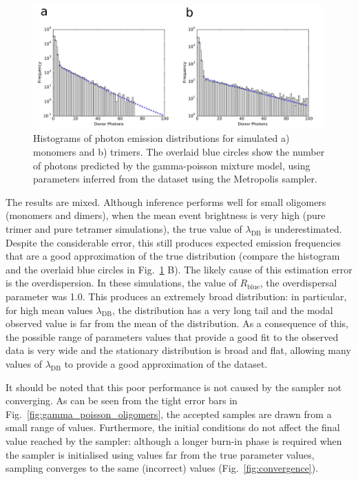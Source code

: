 \begin{figure}
   \begin{center}
      \includegraphics*[clip=true, width=6in]{sizing/oligomer_marginals.pdf}
      \caption{Histograms of photon emission distributions for simulated a) monomers and b) trimers. The overlaid blue circles show the  number of photons predicted by the gamma-poisson mixture model, using parameters inferred from the dataset using the Metropolis sampler.}
      \label{fig:hist_fit_trimer}
   \end{center}
\end{figure}

The results are mixed. Although inference performs well for small oligomers (monomers and dimers), when the mean event brightness is very high (pure trimer and pure tetramer simulations), the true value of $\lambda_{\text{DB}}$ is underestimated. Despite the considerable error, this still produces expected emission frequencies that are a good approximation of the true distribution (compare the histogram and the overlaid blue circles in Fig.~\ref{fig:hist_fit_trimer} B). The likely cause of this estimation error is the overdispersion. In these simulations, the value of $R_{\text{blue}}$, the overdispersal parameter was 1.0. This produces an extremely broad distribution: in particular, for high mean values $\lambda_{\text{DB}}$, the distribution has a very long tail and the modal observed value is far from the mean of the distribution. As a consequence of this, the possible range of parameters values that provide a good fit to the observed data is very wide and the stationary distribution is broad and flat, allowing many values of $\lambda_{\text{DB}}$ to provide a good approximation of the dataset.

It should be noted that this poor performance is not caused by the sampler not converging. As can be seen from the tight error bars in Fig.~\ref{fig:gamma_poisson_oligomers}, the accepted samples are drawn from a small range of values. Furthermore, the initial conditions do not affect the final value reached by the sampler: although a longer burn-in phase is required when the sampler is initialised using values far from the true parameter values, sampling converges to the same (incorrect) values (Fig.~\ref{fig:convergence}).

